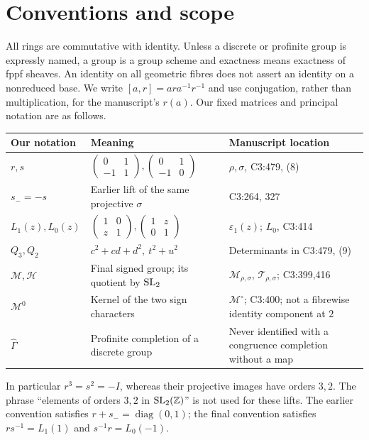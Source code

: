 \section*{Conventions and scope}
All rings are commutative with identity. Unless a discrete or profinite group
is expressly named, a group is a group scheme and exactness means exactness
of fppf sheaves. An identity on all geometric fibres does not assert an
identity on a nonreduced base. We write $[a,r]=ara^{-1}r^{-1}$ and use
conjugation, rather than multiplication, for the manuscript's $r(a)$.
Our fixed matrices and principal notation are as follows.
\begin{center}\small
\begin{tabular}{p{.18\linewidth}p{.42\linewidth}p{.28\linewidth}}
\toprule
Our notation&Meaning&Manuscript location\\\midrule
$r,s$&$\left(\begin{smallmatrix}0&1\\-1&1\end{smallmatrix}\right),
\left(\begin{smallmatrix}0&1\\-1&0\end{smallmatrix}\right)$&$\rho,\sigma$, C3:479, (8)\\
$s_-=-s$&Earlier lift of the same projective $\sigma$&C3:264, 327\\
$L_1(z),L_0(z)$&$\left(\begin{smallmatrix}1&0\\z&1\end{smallmatrix}\right),
\left(\begin{smallmatrix}1&z\\0&1\end{smallmatrix}\right)$&$\varepsilon_1(z)$; $L_0$, C3:414\\
$Q_3,Q_2$&$c^2+cd+d^2,\ t^2+u^2$&Determinants in C3:479, (9)\\
$\mathcal M,\mathcal H$&Final signed group; its quotient by $\operatorname{SL}_2$&$\mathcal M_{\rho,\sigma}$, $\mathcal T_{\rho,\sigma}$; C3:399,416\\
$\mathcal M^0$&Kernel of the two sign characters&$\mathcal M^\circ$; C3:400; not a fibrewise identity component at $2$\\
$\widehat\Gamma$&Profinite completion of a discrete group&Never identified with a congruence completion without a map\\
\bottomrule
\end{tabular}
\end{center}
In particular $r^3=s^2=-I$, whereas their projective images have orders
$3,2$. The phrase ``elements of orders $3,2$ in $\operatorname{SL}_2(\mathbb Z)$'' is not used
for these lifts. The earlier convention satisfies $r+s_-=\operatorname{diag}(0,1)$;
the final convention satisfies $rs^{-1}=L_1(1)$ and $s^{-1}r=L_0(-1)$.

